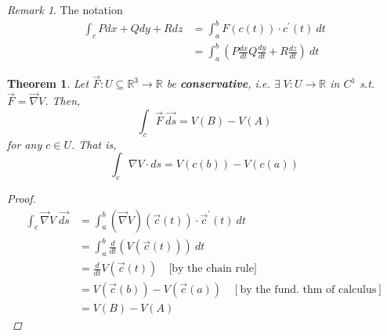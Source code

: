 \documentclass[12pt]{book}
\newtheorem{theorem}{Theorem}[section]
\theoremstyle{definition}
\theoremstyle{remark}
\newtheorem*{remark}{Remark}
\begin{document}
  \begin{remark} 
    The notation 
    \begin{equation*}
      \begin{split}
        \int_{{c}}^{} Pdx + Q dy + Rdz &= \int_{{a}}^{{b}} F(c(t))\cdot c^\prime (t) \: d{t}  \\
        &= \int_{{a}}^{{b}} (P \frac{d {x}}{d {t}} Q \frac{d {y}}{d {t}} + R \frac{d {z}}{d {t}} {}) \: d{t} {}
      \end{split}
    \end{equation*}
  \end{remark}
  \begin{theorem} \label{label}
    Let $\vec{{F}} : U \subseteq \mathbb{R}^3 \to \mathbb{R}$ be \textbf{conservative}, i.e. $\exists \; V : U \to \mathbb{R}$ in $C^1$ s.t. $\vec{{F}} = \vec{{\nabla}} V$. Then, 
    $$\int_{{c}}^{{}} \vec{{F}}  \: \vec{d{s}}= V(B)- V(A) $$
    for any $c \in U$. That is, 
    $$\int_c \nabla V \cdot ds = V(c(b))- V(c(a)) $$
    \begin{proof} 
      \begin{equation*}
        \begin{split}
          \int_c \vec{{\nabla }} V \; \vec{{ds}} & = \int_{{a}}^{{b}} (\vec{{\nabla}} V)(\vec{{c}} (t))\cdot \vec{{c}}^\prime (t) \: d{t} \\ 
          & = \int_{{a}}^{{b}} \frac{d {}}{d {t}} (V(\vec{{c}} (t))) \: d{t} \\ 
          & = \frac{d {}}{d {t}} V(\vec{{c}} (t))\quad \text{[by the chain rule]} \\ 
          & = V(\vec{{c}} (b)) - V(\vec{{c}} (a)) \quad [\text{by the fund. thm of calculus}] \\ 
          & = V(B)- V(A)
        \end{split}
      \end{equation*}
         \end{proof}
  \end{theorem}
\end{document}
